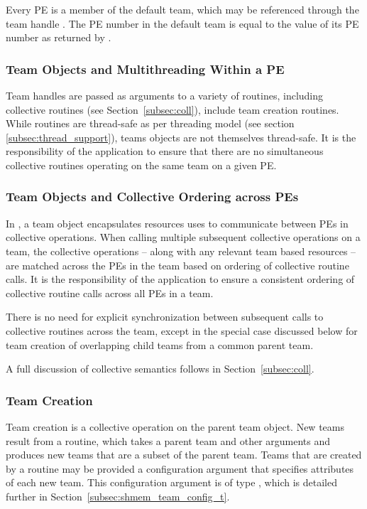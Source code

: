 Every \ac{PE} is a member of the default team, which may be referenced
through the team handle .
The \ac{PE} number in the default team is equal to the
value of its \ac{PE} number as returned by .

\subsubsection*{Team Objects and Multithreading Within a \ac{PE}}

Team handles are passed as arguments to a variety of \openshmem routines,
including collective routines (see Section~\ref{subsec:coll}), include team
creation routines.  While \openshmem routines are thread-safe as
per threading model (see section \ref{subsec:thread_support}),\openshmem
teams objects are not themselves thread-safe. It is the responsibility
of the application to ensure that there are no simultaneous collective
routines operating on the same \openshmem team on a given \ac{PE}.

\subsubsection*{Team Objects and Collective Ordering across \acp{PE}}

In \openshmem, a team object encapsulates resources uses to communicate
between \acp{PE} in collective operations. When calling multiple subsequent
collective operations on a team, the collective operations -- along with any
relevant team based resources -- are matched across the \acp{PE} in the team
based on ordering of collective routine calls. It is the responsibility
of the application to ensure a consistent ordering of collective routine calls
across all \acp{PE} in a team.

There is no need for explicit synchronization between subsequent calls
to collective routines across the team, except in the special case discussed
below for team creation of overlapping child teams from a common parent team.

A full discussion of collective semantics follows in Section~\ref{subsec:coll}.

\subsubsection*{Team Creation}

Team creation is a collective operation on the parent team object. New teams
result from a  routine, which takes a parent team
and other arguments and produces new teams that are a subset of the parent
team. Teams that are created by a  routine may be
provided a configuration argument that specifies attributes of each new team.
This configuration argument is of type , which
is detailed further in Section~\ref{subsec:shmem_team_config_t}.

